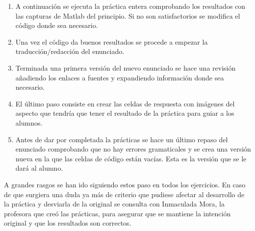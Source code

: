 \begin{enumerate}
    \item A continuación se ejecuta la práctica entera comprobando los resultados con las capturas de Matlab del principio. Si no son satisfactorios se modifica el código donde sea necesario.
    \item Una vez el código da buenos resultados se procede a empezar la traducción/redacción del enunciado.
    \item Terminada una primera versión del nuevo enunciado se hace una revisión añadiendo los enlaces a fuentes y expandiendo información donde sea necesario.
    \item El último paso consiste en crear las celdas de respuesta con imágenes del aspecto que tendría que tener el resultado de la práctica para guiar a los alumnos.
    \item Antes de dar por completada la prácticas se hace un último repaso del enunciado comprobando que no hay errores gramaticales y se crea una versión nueva en la que las celdas de código están vacías. Esta es la versión que se le dará al alumno.
\end{enumerate}

A grandes rasgos se han ido siguiendo estos paso en todos los ejercicios. En caso de que surgiera una duda ya más de criterio que pudiese afectar al desarrollo de la práctica y desviarla de la original se consulta con Inmaculada Mora, la profesora que creó las prácticas, para asegurar que se mantiene la intención original y que los resultados son correctos.